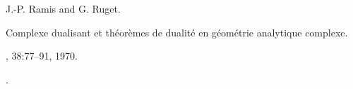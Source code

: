 J.-P. Ramis and G. Ruget.

\newblock Complexe dualisant et th{\'e}or{\`e}mes de dualit{\'e} en
  g{\'e}om{\'e}trie analytique complexe.

, 38:77--91, 1970.

\newblock {}.


